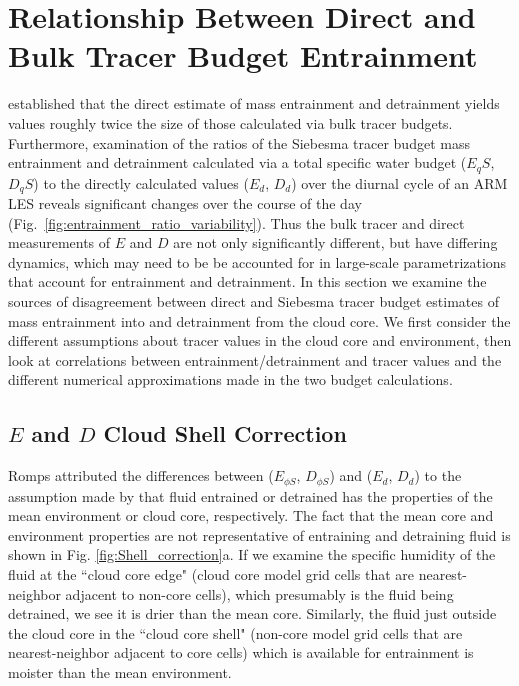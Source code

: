 \documentclass[12pt]{article}
\begin{document}

\section{Relationship Between Direct and Bulk Tracer Budget Entrainment}

\cite{Romps2010} established that the direct estimate of mass
entrainment and detrainment yields values roughly twice the size of
those calculated via bulk tracer budgets.  Furthermore, examination of
the ratios of the Siebesma tracer budget mass entrainment and detrainment
calculated via a total specific water budget ($E_qS$, $D_qS$) to the
directly calculated values ($E_d$, $D_d$) over the diurnal cycle of an
ARM LES reveals significant changes over the course of the day
(Fig.~\ref{fig:entrainment_ratio_variability}).  Thus the bulk tracer
and direct measurements of $E$ and $D$ are not only significantly
different, but have differing dynamics, which may need to be be accounted for
in large-scale parametrizations that account for entrainment and
detrainment.  In this section we examine the sources of disagreement
between direct and Siebesma tracer budget estimates of mass
entrainment into and detrainment from the cloud core. We first
consider the different assumptions about tracer values in the cloud
core and environment, then look at correlations between
entrainment/detrainment and tracer values and the different numerical
approximations made in the two budget calculations.


\subsection{$E$ and $D$ Cloud Shell Correction}

Romps attributed the differences between ($E_{\phi S}$, $D_{\phi S}$)
and ($E_d$, $D_d$) to the assumption made by \cite{Siebesma1995} that
fluid entrained or detrained has the properties of the mean
environment or cloud core, respectively.  The fact that the mean core
and environment properties are not representative of entraining and
detraining fluid is shown in Fig. \ref{fig:Shell_correction}a. If we
examine the specific humidity of the fluid at the ``cloud core edge"
(cloud core model grid cells that are nearest-neighbor adjacent to
non-core cells), which presumably is the fluid being detrained, we see
it is drier than the mean core.  Similarly, the fluid just outside the
cloud core in the ``cloud core shell" (non-core model grid cells that
are nearest-neighbor adjacent to core cells) which is available for
entrainment is moister than the mean environment.
\end{document}
